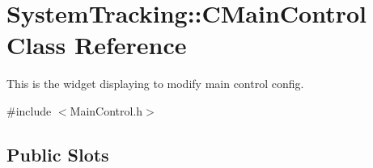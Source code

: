 \hypertarget{classSystemTracking_1_1CMainControl}{\section{\-System\-Tracking\-:\-:\-C\-Main\-Control \-Class \-Reference}
\label{classSystemTracking_1_1CMainControl}
}


\-This is the widget displaying to modify main control config.  




{\ttfamily \#include $<$\-Main\-Control.\-h$>$}

\subsection*{\-Public \-Slots}
